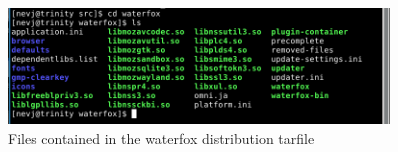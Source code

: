 %

\begin{figure}[!h]
  \centering
   \includegraphics[width=0.9\textwidth]{wfoxfiles.png}
  \caption{Files contained in the waterfox distribution tarfile}
  \label{fig:wfoxfiles}
\end{figure}

%

